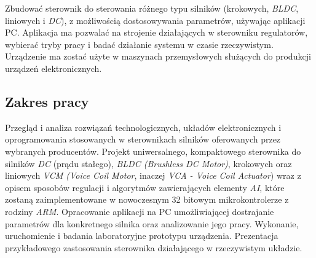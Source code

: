 Zbudować sterownik do sterowania różnego typu silników (krokowych, {\it BLDC}, liniowych i {\it DC}), z możliwością dostosowywania parametrów, używając aplikacji PC. Aplikacja ma pozwalać na strojenie działających w sterowniku regulatorów, wybierać tryby pracy i badać działanie systemu w czasie rzeczywistym. Urządzenie ma zostać użyte w maszynach przemysłowych służących do produkcji urządzeń elektronicznych.

\subsection*{Zakres pracy}

Przegląd i analiza rozwiązań technologicznych, układów elektronicznych i oprogramowania stosowanych w sterownikach silników oferowanych przez wybranych producentów. Projekt uniwersalnego, kompaktowego sterownika do silników {\it DC} (prądu stałego), {\it BLDC (Brushless DC Motor)}, krokowych oraz liniowych {\it VCM (Voice Coil Motor}, inaczej {\it VCA - Voice Coil Actuator}) wraz z opisem sposobów regulacji \linebreak i algorytmów zawierających elementy {\it AI}, które zostaną zaimplementowane w nowoczesnym 32 bitowym mikrokontrolerze z rodziny {\it ARM}. Opracowanie aplikacji na PC umożliwiającej dostrajanie parametrów dla konkretnego silnika oraz analizowanie jego pracy. Wykonanie, uruchomienie i badania laboratoryjne prototypu urządzenia. Prezentacja przykładowego zastosowania sterownika działającego w rzeczywistym układzie.

\clearpage
